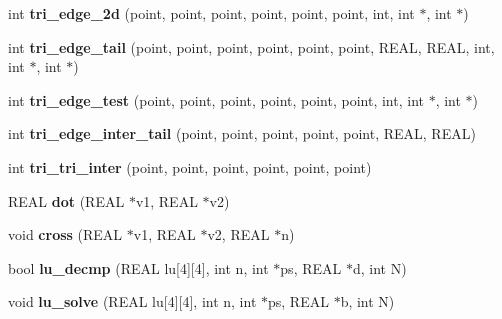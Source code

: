\begin{DoxyCompactItemize}
\item 
\mbox{\label{classtetgenmesh_a6dbb29feba157ab5d848921fa0a11c08}} 
int {\bfseries tri\+\_\+edge\+\_\+2d} (point, point, point, point, point, point, int, int $\ast$, int $\ast$)
\item 
\mbox{\label{classtetgenmesh_a719a8d28b08865c073395b2650c7b477}} 
int {\bfseries tri\+\_\+edge\+\_\+tail} (point, point, point, point, point, point, R\+E\+AL, R\+E\+AL, int, int $\ast$, int $\ast$)
\item 
\mbox{\label{classtetgenmesh_ad7597699d6fc2771701cfd85673d39f9}} 
int {\bfseries tri\+\_\+edge\+\_\+test} (point, point, point, point, point, point, int, int $\ast$, int $\ast$)
\item 
\mbox{\label{classtetgenmesh_aa3f520658457aef3298ec00832c5e960}} 
int {\bfseries tri\+\_\+edge\+\_\+inter\+\_\+tail} (point, point, point, point, point, R\+E\+AL, R\+E\+AL)
\item 
\mbox{\label{classtetgenmesh_a8d7e2af757a3a301a22e46580e037f7c}} 
int {\bfseries tri\+\_\+tri\+\_\+inter} (point, point, point, point, point, point)
\item 
\mbox{\label{classtetgenmesh_afa0906703b590597155547336c360004}} 
R\+E\+AL {\bfseries dot} (R\+E\+AL $\ast$v1, R\+E\+AL $\ast$v2)
\item 
\mbox{\label{classtetgenmesh_a9b5ff4d3e2452044830fbd47d2f70cbd}} 
void {\bfseries cross} (R\+E\+AL $\ast$v1, R\+E\+AL $\ast$v2, R\+E\+AL $\ast$n)
\item 
\mbox{\label{classtetgenmesh_abc03dce4c75ad6ba7086269b1a71fd8b}} 
bool {\bfseries lu\+\_\+decmp} (R\+E\+AL lu\mbox{[}4\mbox{]}\mbox{[}4\mbox{]}, int n, int $\ast$ps, R\+E\+AL $\ast$d, int N)
\item 
\mbox{\label{classtetgenmesh_a6a19601c86a49eed0d2273f1d3b69826}} 
void {\bfseries lu\+\_\+solve} (R\+E\+AL lu\mbox{[}4\mbox{]}\mbox{[}4\mbox{]}, int n, int $\ast$ps, R\+E\+AL $\ast$b, int N)
\item 
\mbox{\label{classtetgenmesh_adeb163031003774cc674a4cf88de1a74}} 

\end{DoxyCompactItemize}

